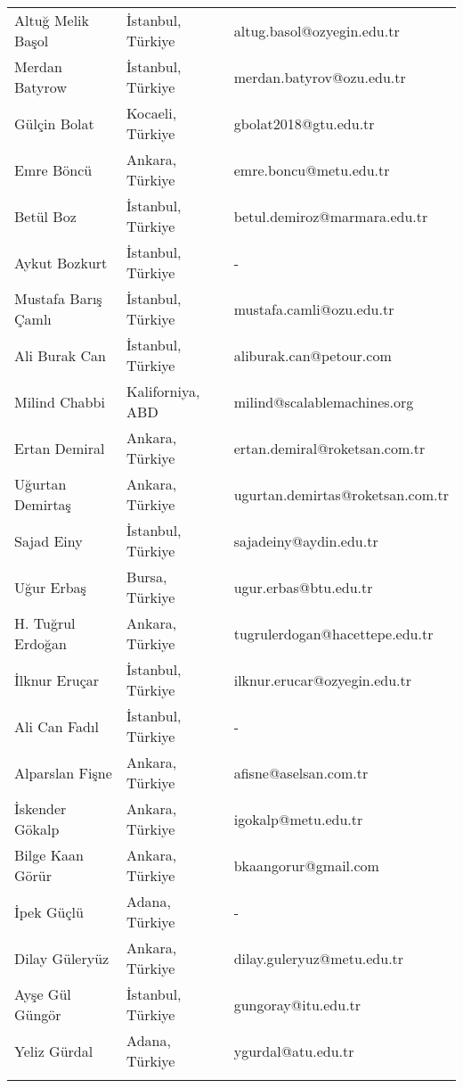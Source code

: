 {\begin{longtable}[c]{@{}lll@{}}
Altuğ Melik Başol & İstanbul, Türkiye & altug.basol@ozyegin.edu.tr \\
\rowcolor[HTML]{C0C0C0} 
Merdan Batyrow & İstanbul, Türkiye & merdan.batyrov@ozu.edu.tr \\
Gülçin Bolat & Kocaeli, Türkiye & gbolat2018@gtu.edu.tr \\
\rowcolor[HTML]{C0C0C0} 
Emre Böncü & Ankara, Türkiye & emre.boncu@metu.edu.tr \\
Betül Boz & İstanbul, Türkiye & betul.demiroz@marmara.edu.tr \\
\rowcolor[HTML]{C0C0C0} 
Aykut Bozkurt & İstanbul, Türkiye & - \\
Mustafa Barış Çamlı & İstanbul, Türkiye & mustafa.camli@ozu.edu.tr \\
\rowcolor[HTML]{C0C0C0} 
Ali Burak Can & İstanbul, Türkiye & aliburak.can@petour.com \\
Milind Chabbi & Kaliforniya, ABD & milind@scalablemachines.org \\
\rowcolor[HTML]{C0C0C0} 
Ertan Demiral & Ankara, Türkiye & ertan.demiral@roketsan.com.tr \\
Uğurtan Demirtaş & Ankara, Türkiye & ugurtan.demirtas@roketsan.com.tr \\
\rowcolor[HTML]{C0C0C0} 
Sajad Einy & İstanbul, Türkiye & sajadeiny@aydin.edu.tr \\
Uğur Erbaş & Bursa, Türkiye & ugur.erbas@btu.edu.tr \\
\rowcolor[HTML]{C0C0C0} 
H. Tuğrul Erdoğan & Ankara, Türkiye & tugrulerdogan@hacettepe.edu.tr \\
İlknur Eruçar & İstanbul, Türkiye & ilknur.erucar@ozyegin.edu.tr \\
\rowcolor[HTML]{C0C0C0} 
Ali Can Fadıl & İstanbul, Türkiye & - \\
Alparslan Fişne & Ankara, Türkiye & afisne@aselsan.com.tr \\
\rowcolor[HTML]{C0C0C0} 
İskender Gökalp & Ankara, Türkiye & igokalp@metu.edu.tr \\
Bilge Kaan Görür & Ankara, Türkiye & bkaangorur@gmail.com \\
\rowcolor[HTML]{C0C0C0} 
İpek Güçlü & Adana, Türkiye & - \\
Dilay Güleryüz & Ankara, Türkiye & dilay.guleryuz@metu.edu.tr \\
\rowcolor[HTML]{C0C0C0} 
Ayşe Gül Güngör & İstanbul, Türkiye & gungoray@itu.edu.tr \\
Yeliz Gürdal & Adana, Türkiye & ygurdal@atu.edu.tr \\
\rowcolor[HTML]{C0C0C0} 

\end{longtable}}
